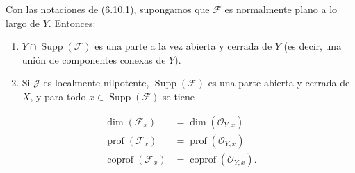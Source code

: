 \begin{proposition}[6.10.3]
\label{IV.2.s6.10.3-fr}
Con las notaciones de \textup{(6.10.1)}, supongamos que $\mathcal F$ es
normalmente plano a lo largo de $Y$. Entonces:
\begin{enumerate}
\item[\textup{(i)}] $Y\cap\operatorname{Supp}(\mathcal F)$ es una parte a la vez
abierta y cerrada de $Y$ \textup{(es decir, una} unión de componentes conexas
de $Y$).
\item[\textup{(ii)}] Si $\mathcal J$ es localmente nilpotente,
$\operatorname{Supp}(\mathcal F)$ es una parte abierta y cerrada de $X$, y
para todo $x\in\operatorname{Supp}(\mathcal F)$ se tiene
\end{enumerate}
\begin{align}
\dim(\mathcal F_x)&=\dim(\mathcal O_{Y,x})
  \tag{6.10.3.1}\label{IV.2.s6.10.3.1-fr}\\
\operatorname{prof}(\mathcal F_x)&=\operatorname{prof}(\mathcal O_{Y,x})
  \tag{6.10.3.2}\label{IV.2.s6.10.3.2-fr}\\
\operatorname{coprof}(\mathcal F_x)&=\operatorname{coprof}(\mathcal O_{Y,x}).
  \tag{6.10.3.3}\label{IV.2.s6.10.3.3-fr}
\end{align}
\end{proposition}

